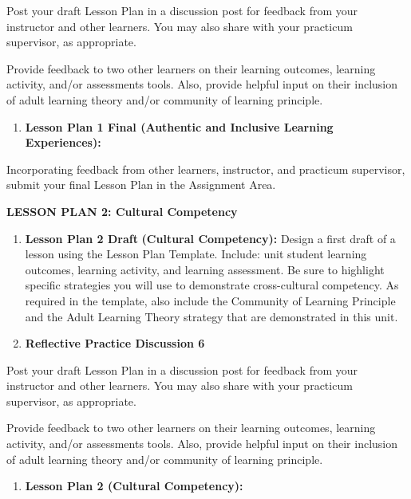 \documentclass[
]{book}
\providecommand{\tightlist}{%
  \setlength{\itemsep}{0pt}\setlength{\parskip}{0pt}}
\begin{document}
Post your draft Lesson Plan in a discussion post for feedback from your instructor and other learners. You may also share with your practicum supervisor, as appropriate.

Provide feedback to two other learners on their learning outcomes, learning activity, and/or assessments tools. Also, provide helpful input on their inclusion of adult learning theory and/or community of learning principle.

\begin{enumerate}
\def\labelenumi{\arabic{enumi}.}
\setcounter{enumi}{2}
\tightlist
\item
  \textbf{Lesson Plan 1 Final (Authentic and Inclusive Learning Experiences):}
\end{enumerate}

Incorporating feedback from other learners, instructor, and practicum supervisor, submit your final Lesson Plan in the Assignment Area.

\textbf{LESSON PLAN 2: Cultural Competency}

\begin{enumerate}
\def\labelenumi{\arabic{enumi}.}
\item
  \textbf{Lesson Plan 2 Draft} \textbf{(Cultural Competency):} Design a first draft of a lesson using the Lesson Plan Template. Include: unit student learning outcomes, learning activity, and learning assessment. Be sure to highlight specific strategies you will use to demonstrate cross-cultural competency. As required in the template, also include the Community of Learning Principle and the Adult Learning Theory strategy that are demonstrated in this unit.
\item
  \textbf{Reflective Practice Discussion 6}
\end{enumerate}

Post your draft Lesson Plan in a discussion post for feedback from your instructor and other learners. You may also share with your practicum supervisor, as appropriate.

Provide feedback to two other learners on their learning outcomes, learning activity, and/or assessments tools. Also, provide helpful input on their inclusion of adult learning theory and/or community of learning principle.

\begin{enumerate}
\def\labelenumi{\arabic{enumi}.}
\setcounter{enumi}{2}
\tightlist
\item
  \textbf{Lesson Plan 2 (Cultural Competency):}
\end{enumerate}
\end{document}
